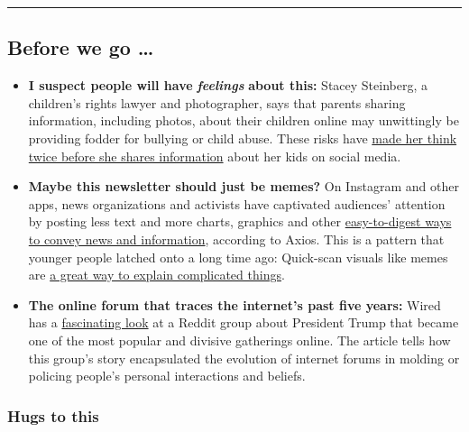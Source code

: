 \begin{center}\rule{0.5\linewidth}{\linethickness}\end{center}

\hypertarget{before-we-go-}{%
\subsection{Before we go \ldots{}}\label{before-we-go-}}

\begin{itemize}
\item
  \textbf{I suspect people will have} \emph{\textbf{feelings}}
  \textbf{about this:} Stacey Steinberg, a children's rights lawyer and
  photographer, says that parents sharing information, including photos,
  about their children online may unwittingly be providing fodder for
  bullying or child abuse. These risks have
  \href{https://www.nytimes.com/2020/08/04/well/family/parents-social-media-privacy.html}{made
  her think twice before she shares information} about her kids on
  social media.
\item
  \textbf{Maybe this newsletter should just be memes?} On Instagram and
  other apps, news organizations and activists have captivated
  audiences' attention by posting less text and more charts, graphics
  and other
  \href{https://www.axios.com/instagram-information-coronavirus-george-floyd-706d1ad3-9d6d-48d4-b085-3469a0d93b56.html}{easy-to-digest
  ways to convey news and information}, according to Axios. This is a
  pattern that younger people latched onto a long time ago: Quick-scan
  visuals like memes are
  \href{https://www.nytimes.com/2019/12/24/style/finance-memes.html}{a
  great way to explain complicated things}.
\item
  \textbf{The online forum that traces the internet's past five years:}
  Wired has a
  \href{https://www.wired.com/story/the-hate-fueled-rise-of-rthe-donald-and-its-epic-takedown/}{fascinating
  look} at a Reddit group about President Trump that became one of the
  most popular and divisive gatherings online. The article tells how
  this group's story encapsulated the evolution of internet forums in
  molding or policing people's personal interactions and beliefs.
\end{itemize}

\hypertarget{hugs-to-this}{%
\subsubsection{Hugs to this}\label{hugs-to-this}}

